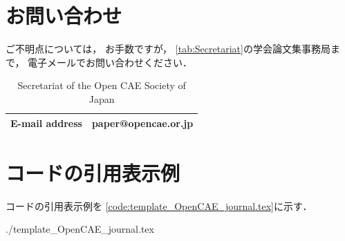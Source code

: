 \documentclass{ltjoc}
\begin{document}
\section{お問い合わせ}
ご不明点については，
お手数ですが，
\autoref{tab:Secretariat}の学会論文集事務局まで，
電子メールでお問い合わせください．
\begin{table}[htbp]
  \centering
  \begin{tabular}{l|l}
    \hline
    E-mail address & paper@opencae.or.jp\\
    \hline
    \end{tabular}
  \caption{Secretariat of the Open CAE Society of Japan}
  \label{tab:Secretariat}
\end{table}

%
%
\clearpage
\appendix
\section{コードの引用表示例}
%
コードの引用表示例を
\autoref{code:template_OpenCAE_journal.tex}に示す．
%

{{./template_OpenCAE_journal.tex}}
%
\end{document}
